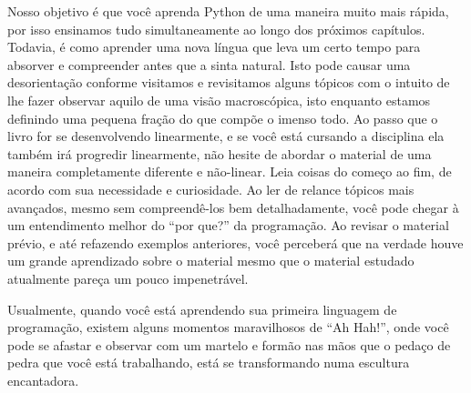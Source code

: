 Nosso objetivo é que você aprenda Python de uma maneira muito mais rápida, por isso ensinamos tudo simultaneamente ao longo dos próximos capítulos. Todavia, é como aprender uma nova língua que leva um certo tempo para absorver e compreender antes que a sinta natural. Isto pode causar uma desorientação conforme visitamos e revisitamos alguns tópicos com o intuito de lhe fazer observar aquilo de uma visão macroscópica, isto enquanto estamos definindo uma pequena fração do que compõe o imenso todo. Ao passo que o livro for se desenvolvendo linearmente, e se você está cursando a disciplina ela também irá progredir linearmente, não hesite de abordar o material de uma maneira completamente diferente e não-linear. Leia coisas do começo ao fim, de acordo com sua necessidade e curiosidade. Ao ler de relance tópicos mais avançados, mesmo sem compreendê-los bem detalhadamente, você pode chegar à um entendimento melhor do ``por que?'' da programação. Ao revisar o material prévio, e até refazendo exemplos anteriores, você perceberá que na verdade houve um grande aprendizado sobre o material mesmo que o material estudado atualmente pareça um pouco impenetrável.

Usualmente, quando você está aprendendo sua primeira linguagem de programação, existem alguns momentos maravilhosos de ``Ah Hah!'', onde você pode se afastar e observar com um martelo e formão nas mãos que o pedaço de pedra que você está trabalhando, está se transformando numa escultura encantadora.

